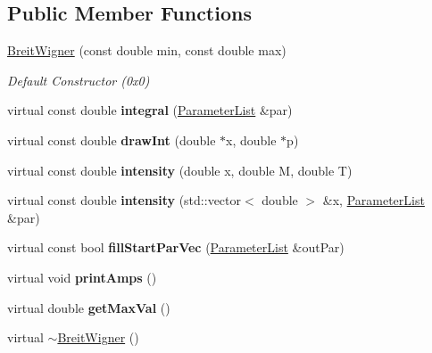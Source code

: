 \subsection*{Public Member Functions}
\begin{DoxyCompactItemize}
\item 
\hypertarget{class_breit_wigner_a3b4a7cb3e7565729dc493ac8387d8278}{\hyperlink{class_breit_wigner_a3b4a7cb3e7565729dc493ac8387d8278}{Breit\-Wigner} (const double min, const double max)}\label{class_breit_wigner_a3b4a7cb3e7565729dc493ac8387d8278}

\begin{DoxyCompactList}\small\item\em Default Constructor (0x0) \end{DoxyCompactList}\item 
\hypertarget{class_breit_wigner_a9d73071fd70cc2ca0ce1e566a3d3127c}{virtual const double {\bfseries integral} (\hyperlink{class_parameter_list}{Parameter\-List} \&par)}\label{class_breit_wigner_a9d73071fd70cc2ca0ce1e566a3d3127c}

\item 
\hypertarget{class_breit_wigner_a7d352fe9651163d4ca8ed35de06827b8}{virtual const double {\bfseries draw\-Int} (double $\ast$x, double $\ast$p)}\label{class_breit_wigner_a7d352fe9651163d4ca8ed35de06827b8}

\item 
\hypertarget{class_breit_wigner_a2bebe3d32b95d04ac730ebe04262f9ff}{virtual const double {\bfseries intensity} (double x, double M, double T)}\label{class_breit_wigner_a2bebe3d32b95d04ac730ebe04262f9ff}

\item 
\hypertarget{class_breit_wigner_a3528a7b3c2bca11a338c1e04707bc817}{virtual const double {\bfseries intensity} (std\-::vector$<$ double $>$ \&x, \hyperlink{class_parameter_list}{Parameter\-List} \&par)}\label{class_breit_wigner_a3528a7b3c2bca11a338c1e04707bc817}

\item 
\hypertarget{class_breit_wigner_a722422da4ac4be5e7706b21e98b74b10}{virtual const bool {\bfseries fill\-Start\-Par\-Vec} (\hyperlink{class_parameter_list}{Parameter\-List} \&out\-Par)}\label{class_breit_wigner_a722422da4ac4be5e7706b21e98b74b10}

\item 
\hypertarget{class_breit_wigner_a54591629d2b9c6bdeb241c50c6670c64}{virtual void {\bfseries print\-Amps} ()}\label{class_breit_wigner_a54591629d2b9c6bdeb241c50c6670c64}

\item 
\hypertarget{class_breit_wigner_a14309665b47fb14b7e89019b6103b17e}{virtual double {\bfseries get\-Max\-Val} ()}\label{class_breit_wigner_a14309665b47fb14b7e89019b6103b17e}

\item 
virtual \hyperlink{class_breit_wigner_abf5cae715df95e2962de1255551751db}{$\sim$\-Breit\-Wigner} ()
\end{DoxyCompactItemize}
